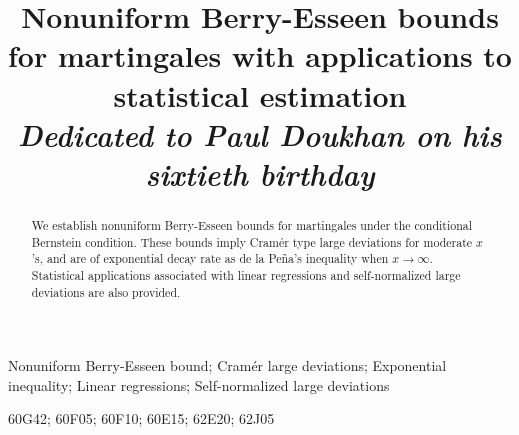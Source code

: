 \documentclass{gSTA2e}
\theoremstyle{plain}
\theoremstyle{definition}
\theoremstyle{remark}
\begin{document}
\title{Nonuniform Berry-Esseen bounds for martingales with applications to statistical estimation    \\  \footnotesize{\textit{Dedicated to Paul Doukhan on his sixtieth birthday}} }



\author{
}

\maketitle

\begin{abstract}
We establish nonuniform Berry-Esseen bounds for martingales under the conditional Bernstein condition. These bounds imply
Cram\'{e}r type large deviations for moderate $x$'s, and are of exponential decay rate as de la Pe\~{n}a's inequality when $x\rightarrow \infty$. Statistical applications associated with linear regressions and   self-normalized large deviations   are also provided.
\end{abstract}

\begin{keywords}
Nonuniform Berry-Esseen bound;
Cram\'{e}r large deviations;
Exponential inequality;
Linear regressions;
Self-normalized large deviations
\end{keywords}

\begin{classcode}  60G42;
 60F05;
 60F10;
 60E15;
 62E20;
62J05
\end{classcode}
\end{document}
